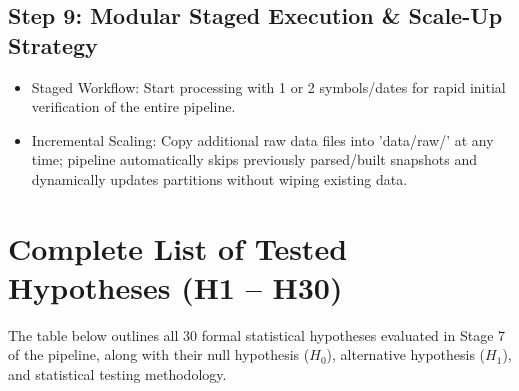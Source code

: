 \documentclass[11pt,a4paper]{article}
\begin{document}
\subsection*{Step 9: Modular Staged Execution \& Scale-Up Strategy}
\begin{itemize}[noitemsep,topsep=2pt]
  \item Staged Workflow: Start processing with 1 or 2 symbols/dates for rapid initial verification of the entire pipeline.
  \item Incremental Scaling: Copy additional raw data files into 'data/raw/' at any time; pipeline automatically skips previously parsed/built snapshots and dynamically updates partitions without wiping existing data.
\end{itemize}
\vspace{0.15cm}
\newpage
\section{Complete List of Tested Hypotheses (H1 -- H30)}
The table below outlines all 30 formal statistical hypotheses evaluated in Stage 7 of the pipeline, along with their null hypothesis ($H_0$), alternative hypothesis ($H_1$), and statistical testing methodology.
\vspace{0.3cm}
\end{document}
